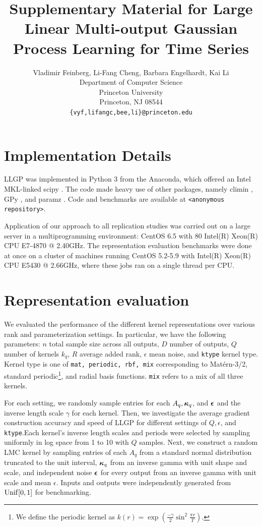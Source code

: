 \documentclass{article}
\title{Supplementary Material for Large Linear Multi-output Gaussian Process Learning for Time Series}
\author{
  Vladimir Feinberg, Li-Fang Cheng, {Barbara Engelhardt}, {Kai Li}\\
  Department of Computer Science\\
  Princeton University\\
  Princeton, NJ 08544 \\
  \texttt{\{vyf,lifangc,bee,li\}@princeton.edu} \\
}
\begin{document}
\maketitle

\section{Implementation Details}

LLGP was implemented in Python 3 from the Anaconda, which offered an Intel MKL-linked scipy \cite{scipy}. The code made heavy use of other packages, namely climin \cite{climin}, GPy \cite{gpy}, and paramz \cite{paramz}. Code and benchmarks are available at \texttt{<anonymous repository>}.

Application of our approach to all replication studies was carried out on a large server in a multiprogramming environment: CentOS 6.5 with 80 Intel(R) Xeon(R) CPU E7-4870 @ 2.40GHz. The representation evaluation benchmarks were done at once on a cluster of machines running CentOS 5.2-5.9 with Intel(R) Xeon(R) CPU E5430 @ 2.66GHz, where these jobs ran on a single thread per CPU.

\section{Representation evaluation}\label{empirical-rep}

We evaluated the performance of the different kernel representations over various rank and parameterization settings. In particular, we have the following parameters: $n$ total sample size across all outputs, $D$ number of outputs, $Q$ number of kernels $k_q$, $R$ average added rank, $\epsilon$ mean noise, and \texttt{ktype} kernel type. Kernel type is one of \texttt{mat, periodic, rbf, mix} corresponding to Mat\'{e}rn-3/2, standard periodic\footnote{We define the periodic kernel as $k(r) = \exp \left(\frac{-\gamma}{2}\sin^2\frac{\pi r}{T}\right)$.}, and radial basis functions. \texttt{mix} refers to a mix of all three kernels.

For each setting, we randomly sample entries for each $A_q,{\boldsymbol\kappa}_q$, and ${\boldsymbol\epsilon}$ and the inverse length scale $\gamma$ for each kernel. Then, we investigate the average gradient construction accuracy and speed of LLGP for different settings of $Q,\epsilon$, and \texttt{ktype}.Each kernel's inverse length scales and periods were selected by sampling uniformly in log space from 1 to 10 with $Q$ samples. Next, we construct a random LMC kernel by sampling entries of each $A_q$ from a standard normal distribution truncated to the unit interval, ${\boldsymbol\kappa}_q$ from an inverse gamma with unit shape and scale, and independent noise ${\boldsymbol\epsilon}$ for every output from an inverse gamma with unit scale and mean $\epsilon$. Inputs and outputs were independently generated from $\operatorname{Unif}[0,1]$ for benchmarking.
\end{document}
